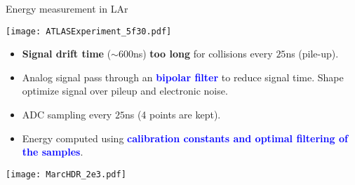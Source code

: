 \begin{frame}{Energy measurement in LAr}
\begin{minipage}{0.3\linewidth}
    \texttt{[image: ATLASExperiment\_5f30.pdf]}
\end{minipage}
\hfill
\begin{minipage}{0.69\linewidth}
\begin{itemize}
\item {\bf Signal drift time }($\sim 600$ns) {\bf too long} for collisions every $25$ns (pile-up).
\item Analog signal pass through an \textcolor{blue}{\bf bipolar filter } to reduce signal time.
Shape optimize signal over pileup and electronic noise.
\item ADC sampling every $25$ns (4 points are kept).
\item Energy computed using \textcolor{blue}{\bf calibration constants and optimal filtering of the samples}.
\end{itemize}
\end{minipage}
\begin{center}
    \texttt{[image: MarcHDR\_2e3.pdf]}
\end{center}

\end{frame}

